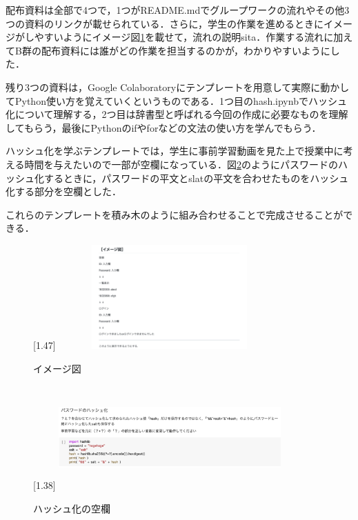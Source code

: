 \documentclass[a4j,11pt]{jsarticle}
\begin{document}
配布資料は全部で4つで，1つがREADME.mdでグループワークの流れやその他3つの資料のリンクが載せられている．さらに，学生の作業を進めるときにイメージがしやすいようにイメージ図\ref{kadai2}を載せて，流れの説明sita．作業する流れに加えてB群の配布資料には誰がどの作業を担当するのかが，わかりやすいようにした．

残り3つの資料は，Google Colaboratoryにテンプレートを用意して実際に動かしてPython使い方を覚えていくというものである．1つ目のhash.ipynbでハッシュ化について理解する，2つ目は辞書型と呼ばれる今回の作成に必要なものを理解してもらう，最後にPythonのifやforなどの文法の使い方を学んでもらう．

ハッシュ化を学ぶテンプレートでは，学生に事前学習動画を見た上で授業中に考える時間を与えたいので一部が空欄になっている．図\ref{kadai3}のようにパスワードのハッシュ化するときに，パスワードの平文とslatの平文を合わせたものをハッシュ化する部分を空欄とした．

これらのテンプレートを積み木のように組み合わせることで完成させることができる．



\begin{figure}[h]
\begin{center}
\scalebox{1.6}[1.47]{
 \includegraphics[clip,width=85mm,height=40mm]{kadai2.pdf}
 }
\end{center}
 \caption{イメージ図}
 \label{kadai2}
\end{figure}

\newpage

\begin{figure}[h]
\begin{center}
\scalebox{1.5}[1.38]{
 \includegraphics[clip,width=85mm,height=40mm]{kadai3.pdf}
 }
\end{center}
 \caption{ハッシュ化の空欄}
 \label{kadai3}
\end{figure}
\end{document}

